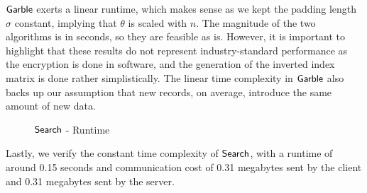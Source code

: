 $ \mathsf{{Garble}} $ exerts a linear runtime, which makes sense as we kept the padding length $ \sigma $ constant, implying that $ \theta $ is scaled with $ n $. The magnitude of the two algorithms is in seconds, so they are feasible as is. However, it is important to highlight that these results do not represent industry-standard performance as the encryption is done in software, and the generation of the inverted index matrix is done rather simplistically. The linear time complexity in $ \mathsf{{Garble}} $ also backs up our assumption that new records, on average, introduce the same amount of new data.

\begin{figure}[H]
    \caption{$ \mathsf{{Search}} $ - Runtime}
    \label{fig:SearchRuntime}
    \centering
\end{figure}

Lastly, we verify the constant time complexity of $ \mathsf{{Search}} $, with a runtime of around 0.15 seconds and communication cost of 0.31 megabytes sent by the client and 0.31 megabytes sent by the server.